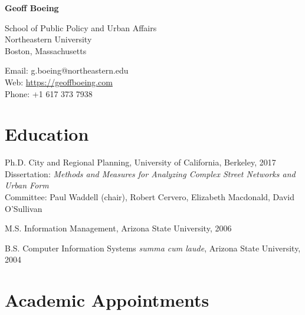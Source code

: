 \documentclass[12pt,letterpaper]{report}
\newcommand{\myname}{Geoff Boeing}
\newcommand{\namefont}[1]{{\normalfont\bfseries\Huge{#1}}}
\begin{document}
	\raggedright
	
	\namefont{\myname}
	
	\vspace{1em}
	\begin{minipage}[t]{0.495\textwidth}
		School of Public Policy and Urban Affairs \\
		Northeastern University \\
		Boston, Massachusetts
	\end{minipage}
	\begin{minipage}[t]{0.495\textwidth}
		Email: g.boeing@northeastern.edu \\
		Web: \href{https://geoffboeing.com}{https://geoffboeing.com} \\
		Phone: +1 617 373 7938
	\end{minipage}
	\vspace{0.5em}
	
	
	
	\section*{Education}
	
	\begin{tablist}
		
		\item[Ph.D.] \tab City and Regional Planning, University of California, Berkeley, 2017 \\
		Dissertation: \textit{Methods and Measures for Analyzing Complex Street Networks and Urban Form} \\
		Committee: Paul Waddell (chair), Robert Cervero, Elizabeth Macdonald, David O'Sullivan
		
		\item[M.S.]  \tab Information Management, Arizona State University, 2006
		
		\item[B.S.]  \tab Computer Information Systems \textit{summa cum laude}, Arizona State University, 2004
		
	\end{tablist}
	
	
	
	\section*{Academic Appointments}
	
\end{document}
